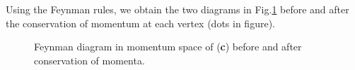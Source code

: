 \documentclass[11pt, a4paper, twoside, openright]{article}
\begin{document}
Using the Feynman rules, we obtain the two diagrams in Fig.\ref{fig:2} before and after the conservation of momentum at each vertex (dots in figure).
\begin{figure}[h!]
\begin{minipage}[c]{0.5\linewidth}
\centering
{}
\end{minipage}
\begin{minipage}[]{0.5\linewidth}
\centering
{}
\end{minipage}
\caption{\label{fig:2} Feynman diagram in momentum space of (\textbf{c}) before and after conservation of momenta. }
\end{figure}
\end{document}
